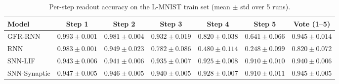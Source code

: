 \begin{table}[t]
    \caption{Per-step readout accuracy on the L-MNIST train set (mean $\pm$ std over 5 runs).}
    \label{tab:per-step-accuracy-train}
    \centering
    \small
    \begin{tabular}{lcccccc}
    \toprule
    \textbf{Model} & \textbf{Step 1} & \textbf{Step 2} & \textbf{Step 3} & \textbf{Step 4} & \textbf{Step 5} & \textbf{Vote (1--5)} \\
    \midrule
    GFR-RNN & $0.993 \pm 0.001$ & $0.981 \pm 0.004$ & $0.932 \pm 0.019$ & $0.820 \pm 0.038$ & $0.641 \pm 0.066$ & $0.945 \pm 0.014$ \\
    RNN & $0.983 \pm 0.001$ & $0.949 \pm 0.023$ & $0.782 \pm 0.086$ & $0.480 \pm 0.114$ & $0.248 \pm 0.099$ & $0.820 \pm 0.072$ \\
    SNN-LIF & $0.943 \pm 0.006$ & $0.941 \pm 0.006$ & $0.935 \pm 0.007$ & $0.925 \pm 0.008$ & $0.910 \pm 0.010$ & $0.940 \pm 0.006$ \\
    SNN-Synaptic & $0.947 \pm 0.005$ & $0.946 \pm 0.005$ & $0.940 \pm 0.005$ & $0.928 \pm 0.007$ & $0.910 \pm 0.011$ & $0.945 \pm 0.005$ \\
    \bottomrule
    \end{tabular}
\end{table}
